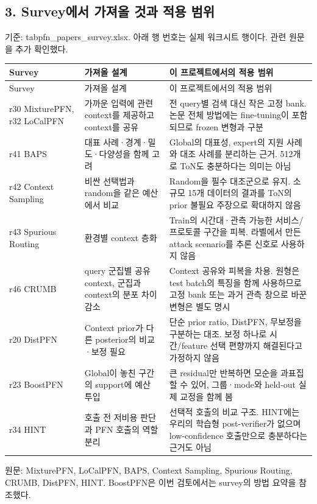 \subsection{3. Survey에서 가져올 것과 적용 범위}
기준: tabpfn\_\allowbreak{}papers\_\allowbreak{}survey.xlsx. 아래 행 번호는 실제 워크시트 행이다. 관련 원문을 추가 확인했다.

\begingroup
\footnotesize
\begin{longtable}{>{\raggedright\arraybackslash}p{}>{\raggedright\arraybackslash}p{}>{\raggedright\arraybackslash}p{}}
\toprule
Survey & 가져올 설계 & 이 프로젝트에서의 적용 범위 \\ \midrule
\endfirsthead
Survey & 가져올 설계 & 이 프로젝트에서의 적용 범위 \\ \midrule
\endhead
{}r30 MixturePFN, r32 LoCalPFN & 가까운 입력에 관련 context를 제공하고 context를 공유 & 전 query별 검색 대신 작은 고정 bank. 논문 전체 방법에는 fine-tuning이 포함되므로 frozen 변형과 구분 \\
{}r41 BAPS & 대표 사례·경계·밀도·다양성을 함께 고려 & Global의 대표성, expert의 지원 사례와 대조 사례를 분리하는 근거. 512개로 ToN도 충분하다는 의미는 아님 \\
{}r42 Context Sampling & 비싼 선택법과 random을 같은 예산에서 비교 & Random을 필수 대조군으로 유지. 소규모 15개 데이터의 결과를 ToN의 prior 불필요 주장으로 확대하지 않음 \\
{}r43 Spurious Routing & 환경별 context 층화 & Train의 시간대·관측 가능한 서비스/\allowbreak{}프로토콜 구간을 피복. 라벨에서 만든 attack scenario를 추론 신호로 사용하지 않음 \\
{}r46 CRUMB & query 군집별 공유 context, 군집과 context의 분포 차이 감소 & Context 공유와 피복을 차용. 원형은 test batch의 특징을 함께 사용하므로 고정 bank 또는 과거 관측 창으로 바꾼 변형은 별도 명시 \\
{}r20 DistPFN & Context prior가 다른 posterior의 비교·보정 필요 & 단순 prior ratio, DistPFN, 무보정을 구분하는 대조. 보정 하나로 시간/\allowbreak{}feature 선택 편향까지 해결된다고 가정하지 않음 \\
{}r23 BoostPFN & Global이 놓친 구간의 support에 예산 투입 & 큰 residual만 반복하면 모순을 과표집할 수 있어, 그룹·mode와 held-out 실제 교정을 함께 봄 \\
{}r34 HINT & 호출 전 저비용 판단과 PFN 호출의 역할 분리 & 선택적 호출의 비교 구조. HINT에는 우리의 학습형 post-verifier가 없으며 low-confidence 호출만으로 충분하다는 근거도 아님 \\
\bottomrule
\end{longtable}
\endgroup
원문: MixturePFN, LoCalPFN, BAPS, Context Sampling, Spurious Routing, CRUMB, DistPFN, HINT. BoostPFN은 이번 검토에서는 survey의 방법 요약을 참조했다.

